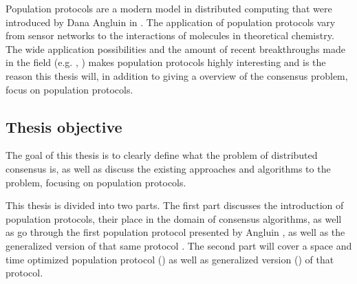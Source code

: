 Population protocols are a modern model in distributed computing that were introduced by Dana Angluin in \cite{angluinComputationNetworksPassively2006}. The application of population protocols vary from sensor networks to the interactions of molecules in theoretical chemistry. \cite{aspnesIntroductionPopulationProtocols2009} The wide application possibilities and the amount of recent breakthroughs made in the field (e.g. \cite{dotyTimeSpaceOptimal2022}, \cite{bankhamerPopulationProtocolsExact2022}) makes population protocols highly interesting and is the reason this thesis will, in addition to giving a overview of the consensus problem, focus on population protocols.


\subsection{Thesis objective}
The goal of this thesis is to clearly define what the problem of distributed consensus is, as well as discuss the existing approaches and algorithms to the problem, focusing on population protocols.

This thesis is divided into two parts. The first part discusses the introduction of population protocols, their place in the domain of consensus algorithms, as well as go through the first population protocol presented by Angluin \cite{angluinSimplePopulationProtocol2008}, as well as the generalized version of that same protocol \cite{AspnesFastConverganceOfKOpinion2023}. The second part will cover a space and time optimized population protocol (\cite{dotyTimeSpaceOptimal2022}) as well as generalized version (\cite{bankhamerPopulationProtocolsExact2022}) of that protocol. 
